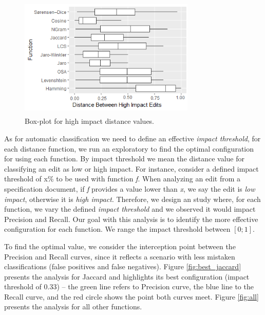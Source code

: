 \begin{figure}[h]
\centering
\includegraphics[height=2.3in,width=3.3in]{figs/Boxplot_SAFF_BZT_HIGH2.png}
\caption{Box-plot for high impact distance values.}
\label{fig:bp_dist_h}
\end{figure}

As for automatic classification we need to define an effective \textit{impact threshold}, for each distance function, we run an exploratory to find the optimal configuration for using each function. By impact threshold we mean the distance value for classifying an edit as low or high impact. For instance, consider a defined impact threshold of x\% to be used with function \textit{f}. When analyzing an edit from a specification document, if \textit{f} provides a value lower than \textit{x}, we say the edit is \textit{low impact}, otherwise it is \textit{high impact}. Therefore, we design an study where, for each function, we vary the defined \textit{impact threshold} and we observed it would impact Precision and Recall. Our goal with this analysis is to identify the more effective configuration for each function. We range the impact threshold between $[0;1]$. 

To find the optimal value, we consider the interception point between the Precision and Recall curves, since it reflects a scenario with less mistaken classifications (false positives and false negatives). %
Figure \ref{fig:best_jaccard} presents the analysis for Jaccard and highlights its best configuration (impact threshold of 0.33) --  the green line refers to Precision curve, the blue line to the Recall curve, and the red circle shows the point both curves meet. Figure \ref{fig:all} presents the analysis for all other functions. 


